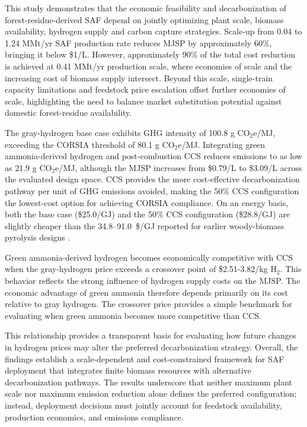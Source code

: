 
This study demonstrates that the economic feasibility and decarbonization of forest-residue-derived SAF depend on jointly optimizing plant scale, biomass availability, hydrogen supply and carbon capture strategies. Scale-up from 0.04 to 1.24 MMt/yr SAF production rate reduces MJSP by approximately 60\%, bringing it below \$1/L. However, approximately 90\% of the total cost reduction is achieved at 0.41 MMt/yr production scale, where economies of scale and the increasing cost of biomass supply intersect. Beyond this scale, single-train capacity limitations and feedstock price escalation offset further economies of scale, highlighting the need to balance market substitution potential against domestic forest-residue availability.

The gray-hydrogen base case exhibits GHG intensity of 100.8 g CO$_2$e/MJ, exceeding the CORSIA threshold of 80.1 g CO$_2$e/MJ. Integrating green ammonia-derived hydrogen and post-combustion CCS reduces emissions to as low as 21.9 g CO$_2$e/MJ, although the MJSP increases from \$0.79/L to \$3.09/L across the evaluated design space. CCS provides the more cost-effective decarbonization pathway per unit of GHG emissions avoided, making the 50\% CCS configuration the lowest-cost option for achieving CORSIA compliance. On an energy basis, both the base case (\$25.0/GJ) and the 50\% CCS configuration (\$28.8/GJ) are slightly cheaper than the 34.8--91.0~\$/GJ reported for earlier woody-biomass pyrolysis designs \citep{dutta2023model, griffin2024opening}.

Green ammonia-derived hydrogen becomes economically competitive with CCS when the gray-hydrogen price exceeds a crossover point of \$2.51-3.82/kg H$_2$. This behavior reflects the strong influence of hydrogen supply costs on the MJSP. The economic advantage of green ammonia therefore depends primarily on its cost relative to gray hydrogen. The crossover price provides a simple benchmark for evaluating when green ammonia becomes more competitive than CCS.

This relationship provides a transparent basis for evaluating how future changes in hydrogen prices may alter the preferred decarbonization strategy. Overall, the findings establish a scale-dependent and cost-constrained framework for SAF deployment that integrates finite biomass resources with alternative decarbonization pathways. The results underscore that neither maximum plant scale nor maximum emission reduction alone defines the preferred configuration; instead, deployment decisions must jointly account for feedstock availability, production economics, and emissions compliance.

